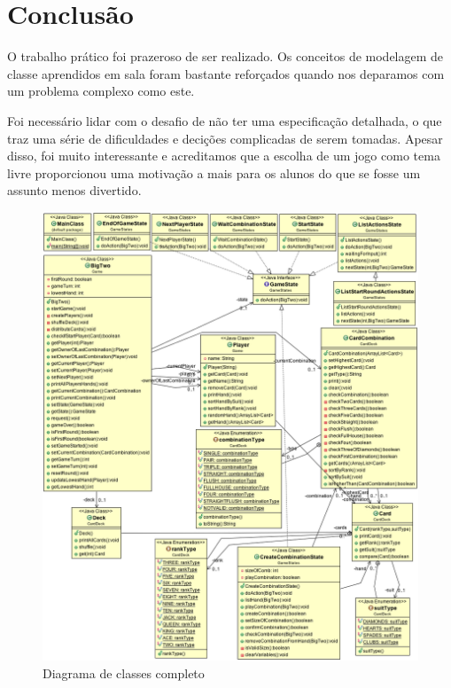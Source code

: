 \documentclass[12pt]{article}
\begin{document}
\section{Conclusão}
\label{conclusao}

O trabalho prático foi prazeroso de ser realizado. Os conceitos de modelagem de classe aprendidos em sala foram bastante reforçados quando nos deparamos com um problema complexo como este.

Foi necessário lidar com o desafio de não ter uma especificação detalhada, o que traz uma série de dificuldades e decições complicadas de serem tomadas. Apesar disso, foi muito interessante e acreditamos que a escolha de um jogo como tema livre proporcionou uma motivação a mais para os alunos do que se fosse um assunto menos divertido. 




\begin{figure}[h!]
	\centering
	\includegraphics[width=.8\textwidth]{umlfull.png}
	\caption{Diagrama de classes completo}
	\label{umlfull}
\end{figure}
\end{document}
